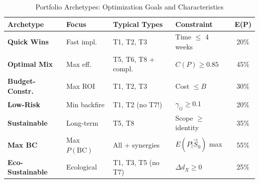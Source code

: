 \begin{table}[htbp]
\centering
\caption{Portfolio Archetypes: Optimization Goals and Characteristics}
\label{tab:hhh-archetypes}
\renewcommand{\arraystretch}{1.4}
\footnotesize
\begin{tabular}{@{}llp{3cm}lc@{}}
\toprule
\textbf{Archetype} & \textbf{Focus} & \textbf{Typical Types} & \textbf{Constraint} & \textbf{E(P)} \\
\midrule
\textbf{Quick Wins} & Fast impl. & T1, T2, T3 & Time $\leq$ 4 weeks & 20\% \\
\textbf{Optimal Mix} & Max eff. & T5, T6, T8 + compl. & $C(P) \geq 0.85$ & 45\% \\
\textbf{Budget-Constr.} & Max ROI & T1, T2, T3 & Cost $\leq B$ & 30\% \\
\textbf{Low-Risk} & Min backfire & T1, T2 (no T7!) & $\gamma_{ij} \geq 0.1$ & 20\% \\
\textbf{Sustainable} & Long-term & T5, T8 & Scope $\geq$ identity & 35\% \\
\textbf{Max BC} & Max $P(\text{BC})$ & All + synergies & $E(P|\vec{S}_0)$ max & 55\% \\
\textbf{Eco-Sustainable} & Ecological & T1, T3, T5 (no T7) & $\Delta d_X \geq 0$ & 25\% \\
\bottomrule
\end{tabular}
\end{table}

